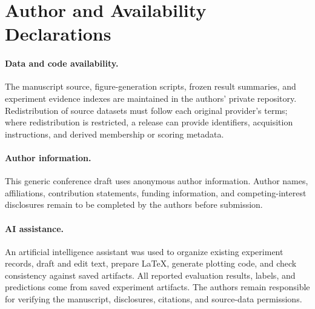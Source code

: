 \section{Author and Availability Declarations}
\label{app:declarations}

\paragraph{Data and code availability.}
The manuscript source, figure-generation scripts, frozen result summaries, and experiment evidence indexes are maintained in the authors' private repository. Redistribution of source datasets must follow each original provider's terms; where redistribution is restricted, a release can provide identifiers, acquisition instructions, and derived membership or scoring metadata.

\paragraph{Author information.}
This generic conference draft uses anonymous author information. Author names, affiliations, contribution statements, funding information, and competing-interest disclosures remain to be completed by the authors before submission.

\paragraph{AI assistance.}
An artificial intelligence assistant was used to organize existing experiment records, draft and edit text, prepare LaTeX, generate plotting code, and check consistency against saved artifacts. All reported evaluation results, labels, and predictions come from saved experiment artifacts. The authors remain responsible for verifying the manuscript, disclosures, citations, and source-data permissions.
